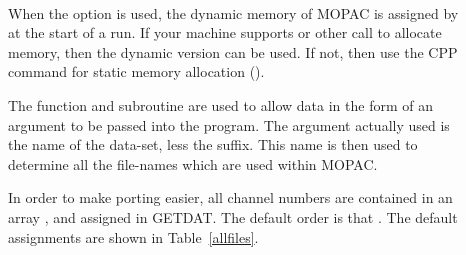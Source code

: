 \begin{description}
\item[]~\\
When the  option is used, the dynamic memory of MOPAC is 
assigned by  at the start of a run. If your machine supports
 or other call to allocate memory, then the dynamic version can be
used.  If not, then use the CPP command for static memory allocation
().

The function  and subroutine  are used to allow data
in  the form of an argument to be passed into the program.  The argument
actually  used is the name of the data-set, less the  suffix.  This
name is then used to determine all the file-names which are used within MOPAC.

In order to make porting easier, all channel numbers are contained in an array
, and  assigned in GETDAT. The default order is that
.  The default assignments are shown in
Table~\ref{allfiles}.


\end{description}
